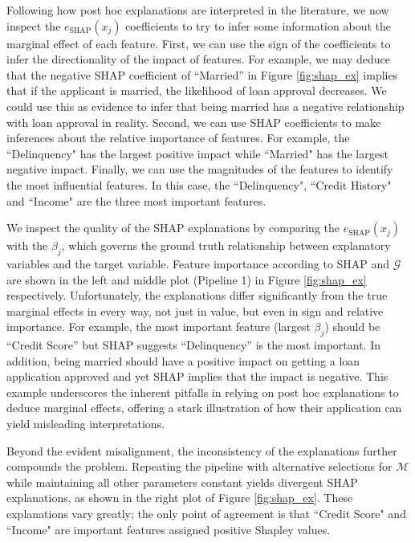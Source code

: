 \documentclass[mnsc,blindrev]{informs3}
\begin{document}
 Following how post hoc explanations are interpreted in the literature, we now inspect the $e_\text{SHAP}(x_j)$ coefficients to try to infer some information about the marginal effect of each feature. First, we can use the sign of the coefficients to infer the directionality of the impact of features. For example, we may deduce that the negative SHAP coefficient of ``Married'' in Figure \ref{fig:shap_ex} implies that if the applicant is married, the likelihood of loan approval decreases. We could use this as evidence to infer that being married has a negative relationship with loan approval in reality. Second, we can use SHAP coefficients to make inferences about the relative importance of features. For example, the ``Delinquency" has the largest positive impact while ``Married" has the largest negative impact. Finally, we can use the magnitudes of the features to identify the most influential features. In this case, the ``Delinquency", ``Credit History" and ``Income" are the three most important features. %


We inspect the quality of the SHAP explanations by comparing the $e_\text{SHAP}(x_j)$ with the $\beta_j$, which governs the ground truth relationship between explanatory variables and the target variable. Feature importance according to SHAP and $\mathcal{G}$ are  shown in the left and middle plot (Pipeline 1) in Figure \ref{fig:shap_ex} respectively. Unfortunately, the explanations differ significantly from the true marginal effects in every way, not just in value, but even in sign and relative importance. For example, the most important feature (largest $\beta_j$) should be ``Credit Score'' but SHAP suggests ``Delinquency'' is the most important. In addition, being married should have a positive impact on getting a loan application approved and yet SHAP implies that the impact is negative. This example underscores the inherent pitfalls in relying on post hoc explanations to deduce marginal effects, offering a stark illustration of how their application can yield misleading interpretations. 

Beyond the evident misalignment, the inconsistency of the explanations further compounds the problem. Repeating the pipeline with alternative selections for $\mathcal{M}$ while maintaining all other parameters constant yields divergent SHAP explanations, as shown in the right plot of Figure \ref{fig:shap_ex}. These explanations vary greatly; the only point of agreement is that ``Credit Score" and ``Income" are important features assigned positive Shapley values. 
\end{document}
